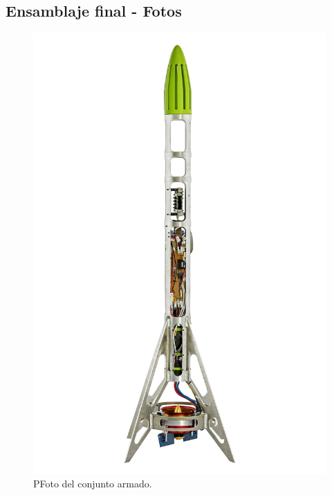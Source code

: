 \null\newpage
\clearpage

\subsection{Ensamblaje final - Fotos}

\begin{figure}[htb]
    \centering
    \includegraphics[width=\linewidth]{fig/hq/wide_plane_bonete.jpg}
    \caption{PFoto del conjunto armado.}
    \label{fig:hq/wide_plane_bonete}
\end{figure}

